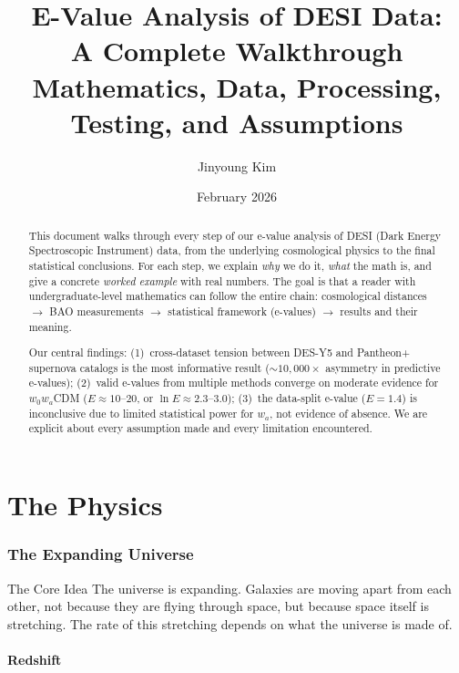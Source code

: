 \documentclass[11pt,a4paper]{article}
\title{\LARGE\textbf{E-Value Analysis of DESI Data:\\A Complete Walkthrough}\\[0.5em]
\large Mathematics, Data, Processing, Testing, and Assumptions}
\author{Jinyoung Kim}
\date{February 2026}
\begin{document}
\maketitle

\begin{abstract}
This document walks through every step of our e-value analysis of DESI (Dark Energy Spectroscopic Instrument) data, from the underlying cosmological physics to the final statistical conclusions. For each step, we explain \textit{why} we do it, \textit{what} the math is, and give a concrete \textit{worked example} with real numbers. The goal is that a reader with undergraduate-level mathematics can follow the entire chain: cosmological distances $\to$ BAO measurements $\to$ statistical framework (e-values) $\to$ results and their meaning.

Our central findings: (1)~cross-dataset tension between DES-Y5 and Pantheon+ supernova catalogs is the most informative result (${\sim}10{,}000\times$ asymmetry in predictive e-values); (2)~valid e-values from multiple methods converge on moderate evidence for $w_0w_a$CDM ($E \approx 10$--$20$, or $\ln E \approx 2.3$--$3.0$); (3)~the data-split e-value ($E = 1.4$) is inconclusive due to limited statistical power for $w_a$, not evidence of absence. We are explicit about every assumption made and every limitation encountered.
\end{abstract}

\tableofcontents
\newpage

\part{The Physics}

\section{The Expanding Universe}
\label{sec:expansion}

\begin{conceptbox}{The Core Idea}
The universe is expanding. Galaxies are moving apart from each other, not because they are flying through space, but because space itself is stretching. The rate of this stretching depends on what the universe is made of.
\end{conceptbox}

\subsection{Redshift}
\end{document}
